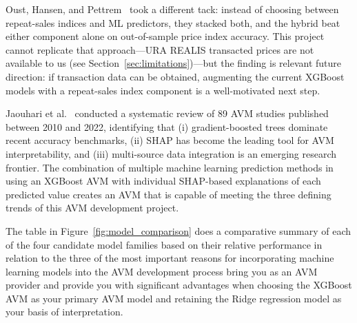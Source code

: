 Oust, Hansen, and Pettrem~\cite{oust2023machine} took a different tack: instead of
choosing between repeat-sales indices and ML predictors, they stacked both, and the
hybrid beat either component alone on out-of-sample price index accuracy.
This project cannot replicate that approach---URA REALIS transacted prices are not
available to us (see Section~\ref{sec:limitations})---but the finding is relevant future
direction: if transaction data can be obtained, augmenting the current XGBoost models
with a repeat-sales index component is a well-motivated next step.

Jaouhari et al.~\cite{jaouhari2024mapping} conducted a systematic review of 89 AVM studies
published between 2010 and 2022, identifying that (i) gradient-boosted trees dominate recent
accuracy benchmarks, (ii) SHAP has become the leading tool for AVM interpretability, and
(iii) multi-source data integration is an emerging research frontier. The combination of multiple machine learning prediction methods in using an 
XGBoost AVM with individual SHAP-based explanations of each predicted value 
creates an AVM that is capable of meeting the three defining trends of this 
AVM development project.

The table in Figure~\ref{fig:model_comparison} does a comparative summary of 
each of the four candidate model families based on their relative performance 
in relation to the three of the most important reasons for incorporating 
machine learning models into the AVM development process bring you as an AVM 
provider and provide you with significant advantages when choosing the XGBoost 
AVM as your primary AVM model and retaining the Ridge regression model as your 
basis of interpretation.

